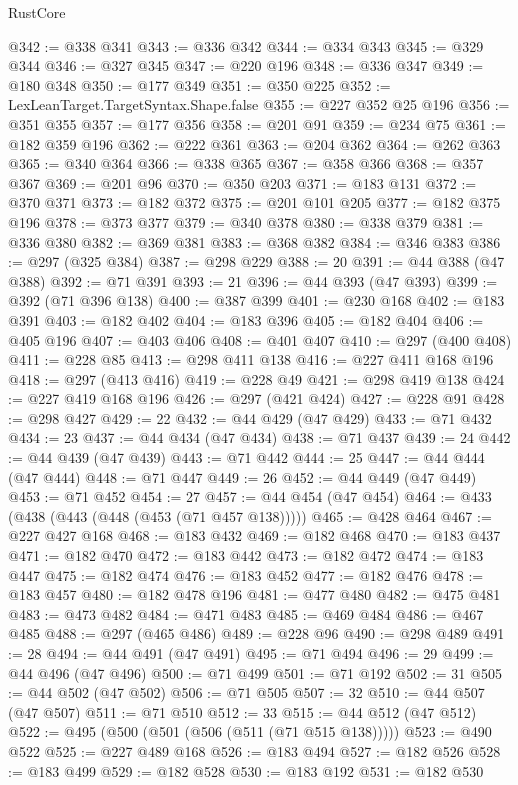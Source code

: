 \begin{lexlean}{RustCore}
\begin{coremodule}
@342 := @338 @341
@343 := @336 @342
@344 := @334 @343
@345 := @329 @344
@346 := @327 @345
@347 := @220 @196
@348 := @336 @347
@349 := @180 @348
@350 := @177 @349
@351 := @350 @225
@352 := LexLeanTarget.TargetSyntax.Shape.false
@355 := @227 @352 @25 @196
@356 := @351 @355
@357 := @177 @356
@358 := @201 @91
@359 := @234 @75
@361 := @182 @359 @196
@362 := @222 @361
@363 := @204 @362
@364 := @262 @363
@365 := @340 @364
@366 := @338 @365
@367 := @358 @366
@368 := @357 @367
@369 := @201 @96
@370 := @350 @203
@371 := @183 @131
@372 := @370 @371
@373 := @182 @372
@375 := @201 @101 @205
@377 := @182 @375 @196
@378 := @373 @377
@379 := @340 @378
@380 := @338 @379
@381 := @336 @380
@382 := @369 @381
@383 := @368 @382
@384 := @346 @383
@386 := @297 (@325 @384)
@387 := @298 @229
@388 := 20
@391 := @44 @388 (@47 @388)
@392 := @71 @391
@393 := 21
@396 := @44 @393 (@47 @393)
@399 := @392 (@71 @396 @138)
@400 := @387 @399
@401 := @230 @168
@402 := @183 @391
@403 := @182 @402
@404 := @183 @396
@405 := @182 @404
@406 := @405 @196
@407 := @403 @406
@408 := @401 @407
@410 := @297 (@400 @408)
@411 := @228 @85
@413 := @298 @411 @138
@416 := @227 @411 @168 @196
@418 := @297 (@413 @416)
@419 := @228 @49
@421 := @298 @419 @138
@424 := @227 @419 @168 @196
@426 := @297 (@421 @424)
@427 := @228 @91
@428 := @298 @427
@429 := 22
@432 := @44 @429 (@47 @429)
@433 := @71 @432
@434 := 23
@437 := @44 @434 (@47 @434)
@438 := @71 @437
@439 := 24
@442 := @44 @439 (@47 @439)
@443 := @71 @442
@444 := 25
@447 := @44 @444 (@47 @444)
@448 := @71 @447
@449 := 26
@452 := @44 @449 (@47 @449)
@453 := @71 @452
@454 := 27
@457 := @44 @454 (@47 @454)
@464 := @433 (@438 (@443 (@448 (@453 (@71 @457 @138)))))
@465 := @428 @464
@467 := @227 @427 @168
@468 := @183 @432
@469 := @182 @468
@470 := @183 @437
@471 := @182 @470
@472 := @183 @442
@473 := @182 @472
@474 := @183 @447
@475 := @182 @474
@476 := @183 @452
@477 := @182 @476
@478 := @183 @457
@480 := @182 @478 @196
@481 := @477 @480
@482 := @475 @481
@483 := @473 @482
@484 := @471 @483
@485 := @469 @484
@486 := @467 @485
@488 := @297 (@465 @486)
@489 := @228 @96
@490 := @298 @489
@491 := 28
@494 := @44 @491 (@47 @491)
@495 := @71 @494
@496 := 29
@499 := @44 @496 (@47 @496)
@500 := @71 @499
@501 := @71 @192
@502 := 31
@505 := @44 @502 (@47 @502)
@506 := @71 @505
@507 := 32
@510 := @44 @507 (@47 @507)
@511 := @71 @510
@512 := 33
@515 := @44 @512 (@47 @512)
@522 := @495 (@500 (@501 (@506 (@511 (@71 @515 @138)))))
@523 := @490 @522
@525 := @227 @489 @168
@526 := @183 @494
@527 := @182 @526
@528 := @183 @499
@529 := @182 @528
@530 := @183 @192
@531 := @182 @530

\end{coremodule}
\end{lexlean}
